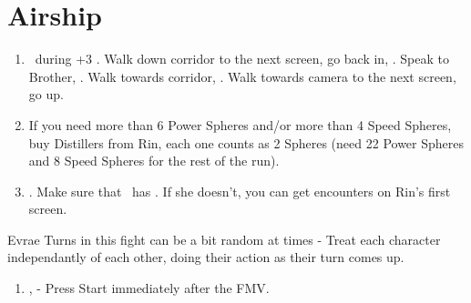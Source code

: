 \chapter{Airship}

\begin{enumerate}
    \item \sd\ during \cs+3 \skippablefmv. Walk down corridor to the next screen, go back in, \sd. Speak to Brother, \sd. Walk towards corridor, \sd. Walk towards camera to the next screen, go up.
    \item If you need more than 6 Power Spheres and/or more than 4 Speed Spheres, buy Distillers from Rin, each one counts as 2 Spheres (need 22 Power Spheres and 8 Speed Spheres for the rest of the run).
    \item \save. Make sure that \rikku\ has \od. If she doesn't, you can get encounters on Rin's first screen.
\end{enumerate}
\begin{battle}[32000]{Evrae}
    Turns in this fight can be a bit random at times - Treat each character independantly of each other, doing their action as their turn comes up.
    \begin{itemize}
    \end{itemize}
\end{battle}
\begin{enumerate}[resume]
    \item \sd, \skippablefmv[3:00] - Press Start immediately after the FMV.
\end{enumerate}